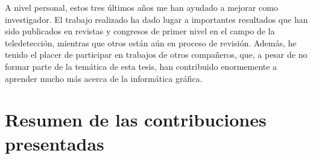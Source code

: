 

A nivel personal, estos tres últimos años me han ayudado a mejorar como investigador. El trabajo realizado ha dado lugar a importantes resultados que han sido publicados en revistas y congresos de primer nivel en el campo de la teledetección, mientras que otros están aún en proceso de revisión. Además, he tenido el placer de participar en trabajos de otros compañeros, que, a pesar de no formar parte de la temática de esta tesis, han contribuido enormemente a aprender mucho más acerca de la informática gráfica.

\section{Resumen de las contribuciones presentadas}

